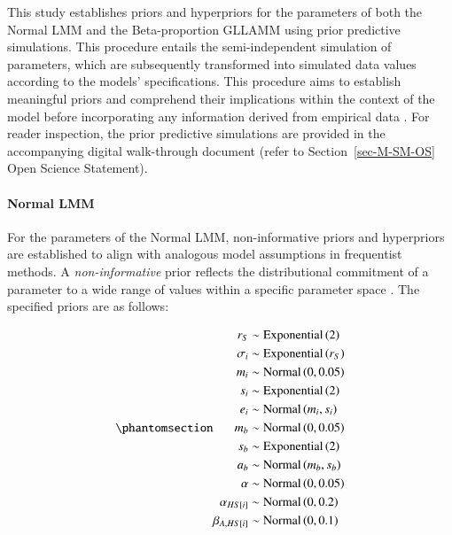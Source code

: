 \documentclass[
  authoryear,
  preprint,
  1p]{elsarticle}
\let\oldparagraph\paragraph
\renewcommand{\paragraph}[1]{\oldparagraph{#1}\mbox{}}
\begin{document}
This study establishes priors and hyperpriors for the parameters of both
the Normal LMM and the Beta-proportion GLLAMM using prior predictive
simulations. This procedure entails the semi-independent simulation of
parameters, which are subsequently transformed into simulated data
values according to the models' specifications. This procedure aims to
establish meaningful priors and comprehend their implications within the
context of the model before incorporating any information derived from
empirical data \citep{McElreath_2020}. For reader inspection, the prior
predictive simulations are provided in the accompanying digital
walk-through document (refer to Section~\ref{sec-M-SM-OS} Open Science
Statement).

\paragraph{Normal LMM}\label{sec-M-SM-P-NLMM}

For the parameters of the Normal LMM, non-informative priors and
hyperpriors are established to align with analogous model assumptions in
frequentist methods. A \emph{non-informative} prior reflects the
distributional commitment of a parameter to a wide range of values
within a specific parameter space \citep{Everitt_et_al_2010}. The
specified priors are as follows:

\begin{equation}\phantomsection\label{eq-normal-LMM-priors}{
\begin{aligned}
r_{S} &\sim \text{Exponential}\left( 2 \right) \\ 
\sigma_{i} &\sim \text{Exponential}\left( r_{S} \right) \\
m_{i} &\sim \text{Normal} \left( 0, 0.05 \right) \\
s_{i} &\sim \text{Exponential} \left( 2 \right) \\
e_{i} &\sim \text{Normal} \left( m_{i}, s_{i} \right) \\
m_{b} &\sim \text{Normal} \left( 0, 0.05 \right) \\
s_{b} &\sim \text{Exponential} \left( 2 \right) \\
a_{b} &\sim \text{Normal} \left( m_{b}, s_{b} \right) \\
\alpha &\sim \text{Normal} \left( 0, 0.05 \right) \\
\alpha_{HS[i]} &\sim \text{Normal} \left( 0, 0.2 \right) \\
\beta_{A,HS[i]} &\sim \text{Normal} \left( 0, 0.1 \right)
\end{aligned} 
}\end{equation}
\end{document}
